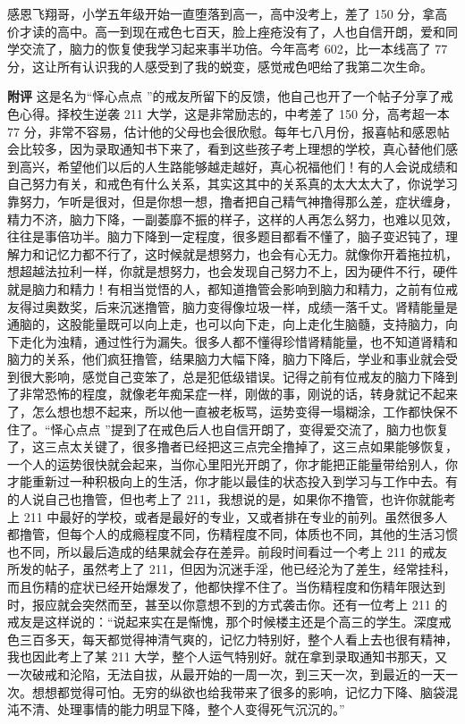 \begin{case}
    感恩飞翔哥，小学五年级开始一直堕落到高一，高中没考上，差了 150 分，拿高价才读的高中。高一到现在戒色七百天，脸上痤疮没有了，人也自信开朗，爱和同学交流了，脑力的恢复使我学习起来事半功倍。今年高考 602，比一本线高了 77 分，这让所有认识我的人感受到了我的蜕变，感觉戒色吧给了我第二次生命。

    \textbf{附评} 这是名为“怿心点点 ”的戒友所留下的反馈，他自己也开了一个帖子分享了戒色心得。择校生逆袭 211 大学，这是非常励志的，中考差了 150 分，高考超一本 77 分，非常不容易，估计他的父母也会很欣慰。每年七八月份，报喜帖和感恩帖会比较多，因为录取通知书下来了，看到这些孩子考上理想的学校，真心替他们感到高兴，希望他们以后的人生路能够越走越好，真心祝福他们！有的人会说成绩和自己努力有关，和戒色有什么关系，其实这其中的关系真的太大太大了，你说学习靠努力，乍听是很对，但是你想一想，撸者把自己精气神撸得那么差，症状缠身，精力不济，脑力下降，一副萎靡不振的样子，这样的人再怎么努力，也难以见效，往往是事倍功半。脑力下降到一定程度，很多题目都看不懂了，脑子变迟钝了，理解力和记忆力都不行了，这时候就是想努力，也会有心无力。就像你开着拖拉机，想超越法拉利一样，你就是想努力，也会发现自己努力不上，因为硬件不行，硬件就是脑力和精力！有相当觉悟的人，都知道撸管会影响到脑力和精力，之前有位戒友得过奥数奖，后来沉迷撸管，脑力变得像垃圾一样，成绩一落千丈。肾精能量是通脑的，这股能量既可以向上走，也可以向下走，向上走化生脑髓，支持脑力，向下走化为浊精，通过性行为漏失。很多人都不懂得珍惜肾精能量，也不知道肾精和脑力的关系，他们疯狂撸管，结果脑力大幅下降，脑力下降后，学业和事业就会受到很大影响，感觉自己变笨了，总是犯低级错误。记得之前有位戒友的脑力下降到了非常恐怖的程度，就像老年痴呆症一样，刚做的事，刚说的话，转身就记不起来了，怎么想也想不起来，所以他一直被老板骂，运势变得一塌糊涂，工作都快保不住了。“怿心点点 ”提到了在戒色后人也自信开朗了，变得爱交流了，脑力也恢复了，这三点太关键了，很多撸者已经把这三点完全撸掉了，这三点如果能够恢复，一个人的运势很快就会起来，当你心里阳光开朗了，你才能把正能量带给别人，你才能重新过一种积极向上的生活，你才能以最佳的状态投入到学习与工作中去。有的人说自己也撸管，但也考上了 211，我想说的是，如果你不撸管，也许你就能考上 211 中最好的学校，或者是最好的专业，又或者排在专业的前列。虽然很多人都撸管，但每个人的成瘾程度不同，伤精程度不同，体质也不同，其他的生活习惯也不同，所以最后造成的结果就会存在差异。前段时间看过一个考上 211 的戒友所发的帖子，虽然考上了 211，但因为沉迷手淫，他已经沦为了差生，经常挂科，而且伤精的症状已经开始爆发了，他都快撑不住了。当伤精程度和伤精年限达到时，报应就会突然而至，甚至以你意想不到的方式袭击你。还有一位考上 211 的戒友是这样说的：“说起来实在是惭愧，那个时候楼主还是个高三的学生。深度戒色三百多天，每天都觉得神清气爽的，记忆力特别好，整个人看上去也很有精神，我也因此考上了某 211 大学，整个人运气特别好。就在拿到录取通知书那天，又一次破戒和沦陷，无法自拔，从最开始的一周一次，到三天一次，到最近的一天一次。想想都觉得可怕。无穷的纵欲也给我带来了很多的影响，记忆力下降、脑袋混沌不清、处理事情的能力明显下降，整个人变得死气沉沉的。”
\end{case}

